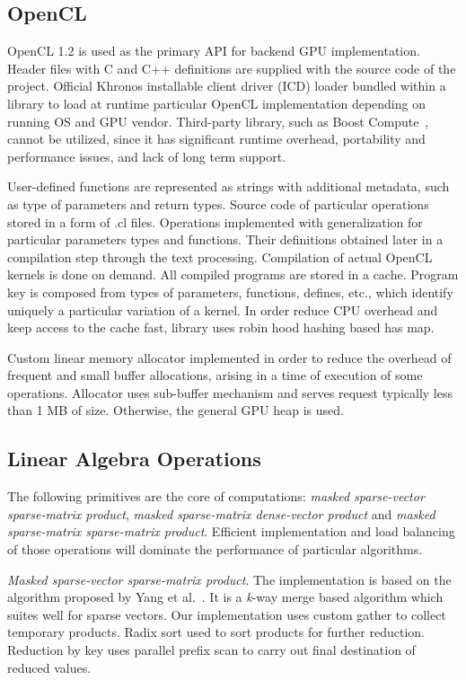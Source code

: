 \subsection{OpenCL}

OpenCL 1.2 is used as the primary API for backend GPU implementation. Header files with C and C++ definitions are supplied with the source code of the project. Official Khronos installable client driver (ICD) loader bundled within a library to load at runtime particular OpenCL implementation depending on running OS and GPU vendor. Third-party library, such as Boost Compute~\cite{10.1145/2909437.2909454:boost:compute}, cannot be utilized, since it has significant runtime overhead, portability and performance issues, and lack of long term support.

User-defined functions are represented as strings with additional metadata, such as type of parameters and return types. 
Source code of particular operations stored in a form of .cl files. 
Operations implemented with generalization for particular parameters types and functions. 
Their definitions obtained later in a compilation step through the text processing.
Compilation of actual OpenCL kernels is done on demand. 
All compiled programs are stored in a cache. Program key is composed from types of parameters, functions, defines, etc., which identify uniquely a particular variation of a kernel. 
In order reduce CPU overhead and keep access to the cache fast, library uses robin hood hashing based has map.

Custom linear memory allocator implemented in order to reduce the overhead of frequent and small buffer allocations, arising in a time of execution of some operations. Allocator uses sub-buffer mechanism and serves request typically less than 1 MB of size. Otherwise, the general GPU heap is used.

\subsection{Linear Algebra Operations}

The following primitives are the core of computations: \textit{masked sparse-vector sparse-matrix product}, \textit{masked sparse-matrix dense-vector product} and \textit{masked sparse-matrix sparse-matrix product}. Efficient implementation and load balancing of those operations will dominate the performance of particular algorithms.

\textit{Masked sparse-vector sparse-matrix product}. The implementation is based on the algorithm proposed by Yang et al.~\cite{7284398:spvspm}. It is a \textit{k}-way merge based algorithm which suites well for sparse vectors. Our implementation uses custom gather to collect temporary products. Radix sort used to sort products for further reduction. Reduction by key uses parallel prefix scan to carry out final destination of reduced values.

